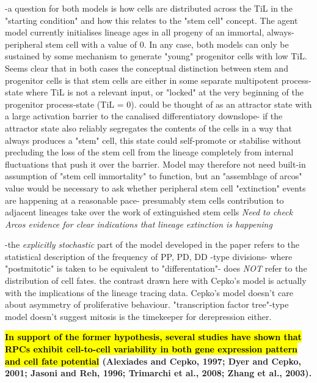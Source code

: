 \documentclass{ut-thesis}
\begin{document}
-a question for both models is how cells are distributed across the TiL in the "starting condition" and how this relates to the "stem cell" concept. The agent model currently initialises lineage ages in all progeny of an immortal, always-peripheral stem cell with a value of 0. In any case, both models can only be sustained by some mechanism to generate "young" progenitor cells with low TiL. Seems clear that in both cases the conceptual distinction between stem and progenitor cells is that stem cells are either in some separate multipotent process-state where TiL is not a relevant input, or "locked" at the very beginning of the progenitor process-state (TiL = 0). could be thought of as an attractor state with a large activation barrier to the canalised differentiatory downslope- if the attractor state also reliably segregates the contents of the cells in a way that always produces a "stem" cell, this state could self-promote or stabilise without precluding the loss of the stem cell from the lineage completely from internal fluctuations that push it over the barrier. Model may therefore not need built-in assumption of "stem cell immortality" to function, but an "assemblage of arcos" value would be necessary to ask whether peripheral stem cell "extinction" events are happening at a reasonable pace- presumably stem cells contribution to adjacent lineages take over the work of extinguished stem cells \textit{Need to check Arcos evidence for clear indications that lineage extinction is happening}

-the \textit{explicitly stochastic} part of the model developed in the paper refers to the statistical description of the frequency of PP, PD, DD -type divisions- where "postmitotic" is taken to be equivalent to "differentation"- does \textit{NOT} refer to the distribution of cell fates. the contrast drawn here with Cepko's model is actually with the implications of the lineage tracing data. Cepko's model doesn't care about asymmetry of proliferative behaviour. "transcription factor tree"-type model \cite{Vitorino2009} doesn't suggest mitosis is the timekeeper for derepression either.

\bigskip

\textbf{\hl{In support of the former hypothesis, several
studies have shown that RPCs exhibit cell-to-cell variability in
both gene expression pattern and cell fate potential} (Alexiades
and Cepko, 1997; Dyer and Cepko, 2001; Jasoni and Reh,
1996; Trimarchi et al., 2008; Zhang et al., 2003).}

\bigskip
\end{document}
